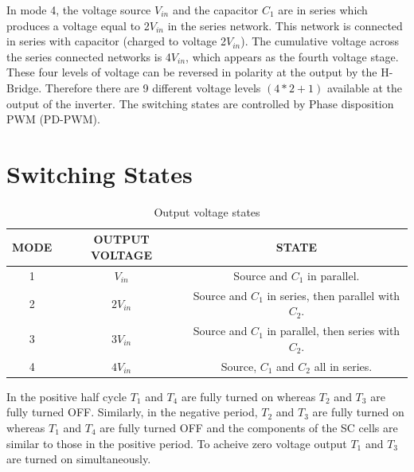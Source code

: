 \documentclass[12pt,a4paper]{report}
\begin{document}
In mode 4, the voltage source $V_{in}$ and the capacitor $C_1$ are in series which produces a voltage equal to
2$V_{in}$ in the series network. This network is connected in series with capacitor (charged to voltage 2$V_{in}$).
The cumulative voltage across the series connected networks is 4$V_{in}$, which appears as the fourth voltage stage. \\


These four levels of voltage can be reversed in polarity at the output by the H-Bridge. Therefore there are 9 different voltage levels $(4*2 + 1)$ available at the output of the inverter. The switching states are controlled by Phase disposition PWM (PD-PWM).\\

\section{Switching States}

\begin{table}[H]
	\begin{center}
		\begin{tabular}{|c|c|c|} 
			\hline
			{\bf MODE} & {\bf OUTPUT VOLTAGE} & {\bf STATE} \\  
			\hline
			1 & $V_{in}$  & Source and $C_1$ in parallel. \\ 
			\hline
			2 & $2V_{in}$ & Source and $C_1$ in series, then parallel with $C_2$. \\
			\hline
			3 & $3V_{in}$ & Source and $C_1$ in parallel, then series with $C_2$. \\
			\hline
			4 & $4V_{in}$ & Source, $C_1$ and $C_2$ all in series. \\
			\hline
		\end{tabular}
	\end{center}
	\caption{Output voltage states}	
\end{table}

In the positive half cycle $T_1$ and $T_4$ are fully turned on whereas $T_2$ and $T_3$ are fully turned OFF. Similarly, in the negative period, $T_2$ and $T_3$ are fully turned on whereas $T_1$ and $T_4$ are fully turned OFF and the components of the SC cells are similar to those in the positive period. To acheive zero voltage output $T_1$ and $T_3$ are turned on simultaneously.\\
\end{document}

